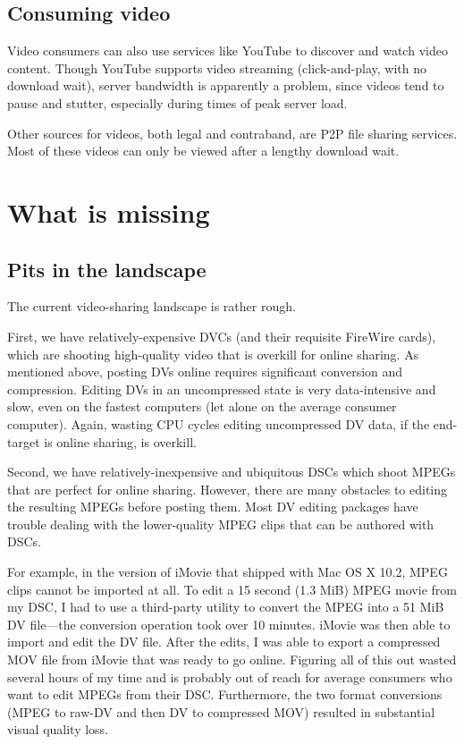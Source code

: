 \documentclass[12pt]{article}
\begin{document}
\subsection{Consuming video}
Video consumers can also use services like YouTube to discover and watch video content.
Though YouTube supports video streaming (click-and-play, with no download wait), server bandwidth is apparently a problem, since videos tend to pause and stutter, especially during times of peak server load.

Other sources for videos, both legal and contraband, are P2P file sharing services.
Most of these videos can only be viewed after a lengthy download wait.


\section{What is missing}

\subsection{Pits in the landscape}
The current video-sharing landscape is rather rough.

First, we have relatively-expensive DVCs (and their requisite FireWire cards), which are shooting high-quality video that is overkill for online sharing.
As mentioned above, posting DVs online requires significant conversion and compression.
Editing DVs in an uncompressed state is very data-intensive and slow, even on the fastest computers (let alone on the average consumer computer).
Again, wasting CPU cycles editing uncompressed DV data, if the end-target is online sharing, is overkill.
 
Second, we have relatively-inexpensive and ubiquitous DSCs which shoot MPEGs that are perfect for online sharing.
However, there are many obstacles to editing the resulting MPEGs before posting them.
Most DV editing packages have trouble dealing with the lower-quality MPEG clips that can be authored with DSCs.

For example, in the version of iMovie that shipped with Mac OS X 10.2, MPEG clips cannot be imported at all.
To edit a 15 second (1.3 MiB) MPEG movie from my DSC, I had to use a third-party utility to convert the MPEG into a 51 MiB DV file---the conversion operation took over 10 minutes.
iMovie was then able to import and edit the DV file.
After the edits, I was able to export a compressed MOV file from iMovie that was ready to go online.
Figuring all of this out wasted several hours of my time and is probably out of reach for average consumers who want to edit MPEGs from their DSC.
Furthermore, the two format conversions (MPEG to raw-DV and then DV to compressed MOV) resulted in substantial visual quality loss.
\end{document}
